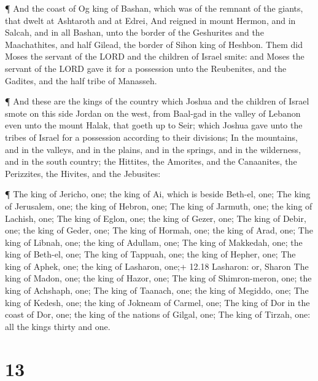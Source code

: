  ¶ And the coast of Og king of Bashan, which was of the
remnant of the giants, that dwelt at Ashtaroth and at Edrei,
 And reigned in mount Hermon, and in Salcah, and in all
Bashan, unto the border of the Geshurites and the Maachathites, and half
Gilead, the border of Sihon king of Heshbon.  Them did Moses
the servant of the LORD and the children of Israel smite: and Moses the
servant of the LORD gave it for a possession unto the Reubenites, and
the Gadites, and the half tribe of Manasseh.

 ¶ And these are the kings of the country which Joshua and
the children of Israel smote on this side Jordan on the west, from
Baal-gad in the valley of Lebanon even unto the mount Halak, that goeth
up to Seir; which Joshua gave unto the tribes of Israel for a possession
according to their divisions;  In the mountains, and in the
valleys, and in the plains, and in the springs, and in the wilderness,
and in the south country; the Hittites, the Amorites, and the
Canaanites, the Perizzites, the Hivites, and the Jebusites:

 ¶ The king of Jericho, one; the king of Ai, which is beside
Beth-el, one;  The king of Jerusalem, one; the king of
Hebron, one;  The king of Jarmuth, one; the king of
Lachish, one;  The king of Eglon, one; the king of Gezer,
one;  The king of Debir, one; the king of Geder, one;
 The king of Hormah, one; the king of Arad, one;
 The king of Libnah, one; the king of Adullam, one;
 The king of Makkedah, one; the king of Beth-el, one;
 The king of Tappuah, one; the king of Hepher, one;
 The king of Aphek, one; the king of Lasharon, one;+ 12.18
Lasharon: or, Sharon  The king of Madon, one; the king of
Hazor, one;  The king of Shimron-meron, one; the king of
Achshaph, one;  The king of Taanach, one; the king of
Megiddo, one;  The king of Kedesh, one; the king of Jokneam
of Carmel, one;  The king of Dor in the coast of Dor, one;
the king of the nations of Gilgal, one;  The king of
Tirzah, one: all the kings thirty and one.

\hypertarget{section-12}{%
\section{13}\label{section-12}}

